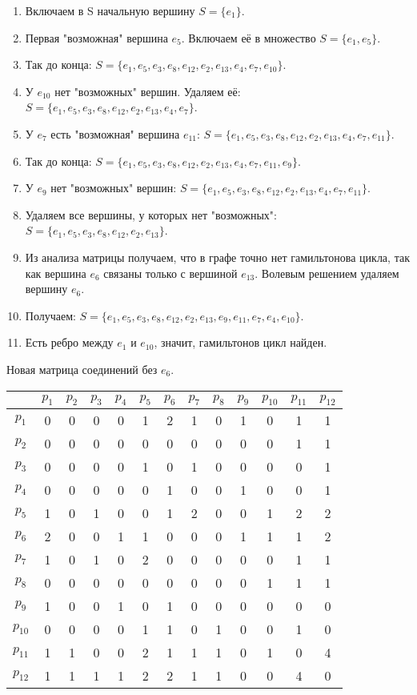 \documentclass[12pt, a4paper] {ncc}
\begin{document}
\begin{enumerate}
	\item Включаем в S начальную вершину $S = \{ e_1 \}$.
	\item Первая "возможная" вершина $e_5$. Включаем её в множество $S = \{ e_1, e_5 \}$.
	\item Так до конца: $S = \{ e_1, e_5, e_3, e_8, e_{12}, e_2, e_{13}, e_4, e_7, e_{10}\}$.
	\item У $e_{10}$ нет "возможных" вершин. Удаляем её: $S = \{ e_1, e_5, e_3, e_8, e_{12}, e_2, e_{13}, e_4, e_7\}$.
	\item У $e_7$ есть "возможная" вершина $e_{11}$: $S = \{ e_1, e_5, e_3, e_8, e_{12}, e_2, e_{13}, e_4, e_7, e_{11}\}$.
	\item Так до конца: $S = \{ e_1, e_5, e_3, e_8, e_{12}, e_2, e_{13}, e_4, e_7, e_{11}, e_9\}$.
	\item У $e_9$ нет "возможных" вершин: $S = \{ e_1, e_5, e_3, e_8, e_{12}, e_2, e_{13}, e_4, e_7, e_{11}\}$.
	\item Удаляем все вершины, у которых нет "возможных": $S = \{ e_1, e_5, e_3, e_8, e_{12}, e_2, e_{13}\}$. 
	\item Из анализа матрицы получаем, что в графе точно нет гамильтонова цикла, так как вершина $e_6$ связаны только с вершиной $e_13$.
		  Волевым решением удаляем вершину $e_6$.
	\item Получаем: $S = \{ e_1, e_5, e_3, e_8, e_{12}, e_2, e_{13}, e_9, e_{11}, e_7, e_4, e_{10}\}$.
	\item Есть ребро между $e_1$ и $e_{10}$, значит, гамильтонов цикл найден.
\end{enumerate}

Новая матрица соединений без $e_6$.
\begin{longtable}{|c|c|c|c|c|c|c|c|c|c|c|c|c|}
\hline
&$p_{1}$&$p_{2}$&$p_{3}$&$p_{4}$&$p_{5}$&$p_{6}$&$p_{7}$&$p_{8}$&$p_{9 }$&$p_{10}$&$p_{11}$&$p_{12}$\\
\hline
$p_{1}$  & 0&0&0&0&1&2&1&0&1&0&1&1 \\ \hline 
$p_{2}$  & 0&0&0&0&0&0&0&0&0&0&1&1 \\ \hline 
$p_{3}$  & 0&0&0&0&1&0&1&0&0&0&0&1 \\ \hline 
$p_{4}$  & 0&0&0&0&0&1&0&0&1&0&0&1 \\ \hline 
$p_{5}$  & 1&0&1&0&0&1&2&0&0&1&2&2 \\ \hline 
$p_{6}$  & 2&0&0&1&1&0&0&0&1&1&1&2 \\ \hline 
$p_{7}$  & 1&0&1&0&2&0&0&0&0&0&1&1 \\ \hline 
$p_{8}$  & 0&0&0&0&0&0&0&0&0&1&1&1 \\ \hline 
$p_{9 }$ & 1&0&0&1&0&1&0&0&0&0&0&0 \\ \hline 
$p_{10}$ & 0&0&0&0&1&1&0&1&0&0&1&0 \\ \hline 
$p_{11}$ & 1&1&0&0&2&1&1&1&0&1&0&4 \\ \hline 
$p_{12}$ & 1&1&1&1&2&2&1&1&0&0&4&0 \\ \hline 
\end{longtable}
\end{document}
